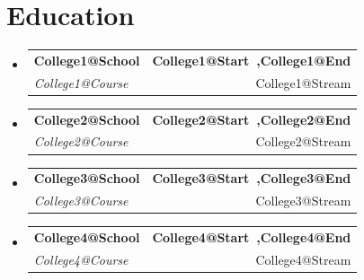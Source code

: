 \documentclass[letterpaper,11pt]{article}
\makeatletter
\newcommand{\resumeSubheading}[4]{
  \vspace{-2pt}\item
  \begin{tabular*}{\textwidth}[t]{l@{\extracolsep{\fill}}r}
    \textbf{#1} & \textbf{\small #2} \\
    \textit{\small #3} & {\small #4} \\
  \end{tabular*}\vspace{-4pt}
}
\newcommand{\resumeProjectHeading}[2]{
    \item
    \begin{tabular*}{1.001\textwidth}{l@{\extracolsep{\fill}}r}
      \small#1 & \textbf{\small #2}\\
    \end{tabular*}\vspace{-7pt}
}
\newcommand{\resumeSubHeadingListStart}{\begin{itemize}[leftmargin=0.0in, label={}]}
\newcommand{\resumeSubHeadingListEnd}{\end{itemize}}
\makeatother
\begin{document}
\section{Education}
\resumeSubHeadingListStart

\resumeSubheading{\csname College1@School\endcsname}
{\csname College1@Start\endcsname \ ,\csname College1@End\endcsname}
{\csname College1@Course\endcsname}
{\csname College1@Stream\endcsname}

\resumeSubheading{\csname College2@School\endcsname}
{\csname College2@Start\endcsname \ ,\csname College2@End\endcsname}
{\csname College2@Course\endcsname}
{\csname College2@Stream\endcsname}

\resumeSubheading{\csname College3@School\endcsname}
{\csname College3@Start\endcsname \ ,\csname College3@End\endcsname}
{\csname College3@Course\endcsname}
{\csname College3@Stream\endcsname}

\resumeSubheading{\csname College4@School\endcsname}
{\csname College4@Start\endcsname \ ,\csname College4@End\endcsname}
{\csname College4@Course\endcsname}
{\csname College4@Stream\endcsname}

\resumeSubHeadingListEnd











\end{document}
